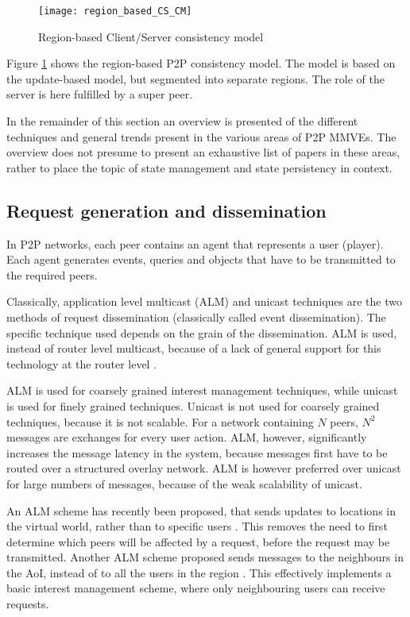 \begin{figure}[htbp]
 \centering
 \texttt{[image: region\_based\_CS\_CM]}
 \caption{Region-based Client/Server consistency model}
 \label{fig_cs_region_cm}
\end{figure}
%
Figure \ref{fig_cs_region_cm} shows the region-based P2P consistency model. The model is based on the update-based model, but segmented into separate regions. The role of the server is here fulfilled by a super peer.

In the remainder of this section an overview is presented of the different techniques and general trends present in the various areas of P2P MMVEs. The overview does not presume to present an exhaustive list of papers in these areas, rather to place the topic of state management and state persistency in context.

\subsection{Request generation and dissemination}

In P2P networks, each peer contains an agent that represents a user (player). Each agent generates events, queries and objects that have to be transmitted to the required peers.

Classically, application level multicast (ALM) and unicast techniques are the two methods of request dissemination (classically called event dissemination). The specific technique used depends on the grain of the dissemination. ALM is used, instead of router level multicast, because of a lack of general support for this technology at the router level \cite{ip_multicast_deployment_issues}.

ALM is used for coarsely grained interest management techniques, while unicast is used for finely grained techniques. Unicast is not used for coarsely grained techniques, because it is not scalable. For a network containing $N$ peers, $N^2$ messages are exchanges for every user action. ALM, however, significantly increases the message latency in the system, because messages first have to be routed over a structured overlay network. ALM is however preferred over unicast for large numbers of messages, because of the weak scalability of unicast.

An ALM scheme has recently been proposed, that sends updates to locations in the virtual world, rather than to specific users \cite{Ghaffari_Delaunay_churn_mobility}. This removes the need to first determine which peers will be affected by a request, before the request may be transmitted. Another ALM scheme proposed sends messages to the neighbours in the AoI, instead of to all the users in the region \cite{Seeger_area_based_gossip_multicast}. This effectively implements a basic interest management scheme, where only neighbouring users can receive requests.

